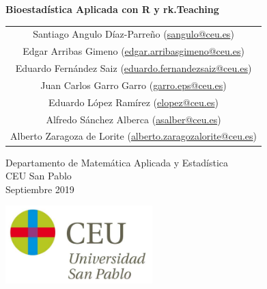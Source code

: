 \begin{titlepage}
% 
% 
\thispagestyle{empty}
\vspace*{7cm}
\par

\begin{center}
\normalfont\fontsize{30}{30}\selectfont
{\bfseries \color{blueceu}Bioestadística Aplicada con R y rk.Teaching}
\end{center}
\vspace{1cm}
\begin{center}
\Large
\begin{tabular}{c}
Santiago Angulo Díaz-Parreño (\url{sangulo@ceu.es})\\
Edgar Arribas Gimeno (\url{edgar.arribasgimeno@ceu.es})\\
Eduardo Fernández Saiz (\url{eduardo.fernandezsaiz@ceu.es})\\
Juan Carlos Garro Garro (\url{garro.eps@ceu.es})\\
Eduardo López Ramírez (\url{elopez@ceu.es})\\
Alfredo Sánchez Alberca (\url{asalber@ceu.es})\\
Alberto Zaragoza de Lorite (\url{alberto.zaragozalorite@ceu.es})    
\end{tabular}

\medskip 
Departamento de Matemática Aplicada y Estadística\\ CEU San Pablo\\[1cm]
\medskip 
Septiembre 2019

\vspace{1cm}
\includegraphics[height=3cm]{img/logo_uspceu}
\end{center}
\vfill
\end{titlepage}